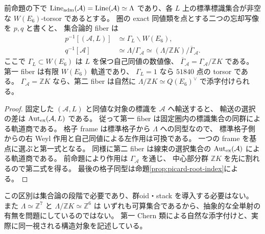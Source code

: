 \begin{corollary}\label{cor:actual-set-fibers}
前命題の下で
$\operatorname{Line}_{\rm adm}(\mathcal A)=\operatorname{Line}(\mathcal A)\simeq\Lambda$
であり、各 $L$ 上の標準標識集合が非空な $W(E_6)$-torsor であるとする。
圏の exact 同値類を点とする二つの忘却写像を $p,q$ と書くと、
集合論的 fiber は
\begin{align}
 p^{-1}[(\mathcal A,L)]&\simeq\Gamma_L\backslash W(E_6),\label{eq:actual-first-fiber}\\
 q^{-1}[\mathcal A]&\simeq\Lambda/\Gamma_{\mathcal A}
 \simeq(\Lambda/\mathbb ZK)/\overline\Gamma_{\mathcal A}.
 \label{eq:actual-second-fiber}
\end{align}
ここで $\Gamma_L\subset W(E_6)$ は $L$ を保つ自己同値の数値像、
$\overline\Gamma_{\mathcal A}=\Gamma_{\mathcal A}/\mathbb ZK$ である。
第一 fiber は有限 $W(E_6)$ 軌道であり、
$\Gamma_L=1$ なら $51840$ 点の torsor である。
$\Gamma_{\mathcal A}=\mathbb ZK$ なら、第二 fiber は自然に
$\Lambda/\mathbb ZK\simeq Q(E_6)^\vee$ で添字付けられる。
\end{corollary}
\begin{proof}
固定した $(\mathcal A,L)$ と同値な対象の標識を $\mathcal A$ へ輸送すると、
輸送の選択の差は $\operatorname{Aut}_{\rm ex}(\mathcal A,L)$ である。
従って第一 fiber は固定圏内の標識集合の同群による軌道商である。
格子 frame は標準格子から $\Lambda$ への同型なので、
標準格子側からの右 Weyl 作用と自己同値による左作用は可換である。
一つの frame を基点に選ぶと第一式となる。
同様に第二 fiber は線束の選択集合の $\operatorname{Aut}_{\rm ex}(\mathcal A)$ による軌道商である。
前命題により作用は $\Gamma_{\mathcal A}$ を通じ、
中心部分群 $\mathbb ZK$ を先に割れるので第二式を得る。
最後の格子同型は命題\ref{prop:picard-root-index}による。
\end{proof}

この区別は集合論の段階で必要であり、群oid・stack を導入する必要はない。
また $\Lambda\simeq\mathbb Z^7$ と $\Lambda/\mathbb ZK\simeq\mathbb Z^6$ は
いずれも可算集合であるから、抽象的な全単射の有無を問題にしているのではない。
第一 Chern 類による自然な添字付けと、実際に同一視される構造対象を記述している。

